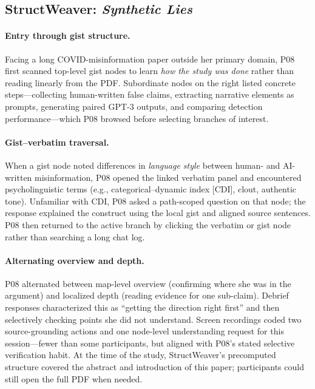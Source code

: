 \documentclass[manuscript,review,anonymous]{acmart}
\begin{document}
\subsection{StructWeaver: \textit{Synthetic Lies}}

\paragraph{Entry through gist structure.}
Facing a long COVID-misinformation paper outside her primary domain, P08 first scanned top-level gist nodes to learn \textit{how the study was done} rather than reading linearly from the PDF. Subordinate nodes on the right listed concrete steps---collecting human-written false claims, extracting narrative elements as prompts, generating paired GPT-3 outputs, and comparing detection performance---which P08 browsed before selecting branches of interest.

\paragraph{Gist--verbatim traversal.}
When a gist node noted differences in \textit{language style} between human- and AI-written misinformation, P08 opened the linked verbatim panel and encountered psycholinguistic terms (e.g., categorical--dynamic index [CDI], clout, authentic tone). Unfamiliar with CDI, P08 asked a path-scoped question on that node; the response explained the construct using the local gist and aligned source sentences. P08 then returned to the active branch by clicking the verbatim or gist node rather than searching a long chat log.

\paragraph{Alternating overview and depth.}
P08 alternated between map-level overview (confirming where she was in the argument) and localized depth (reading evidence for one sub-claim). Debrief responses characterized this as ``getting the direction right first'' and then selectively checking points she did not understand. Screen recordings coded two source-grounding actions and one node-level understanding request for this session---fewer than some participants, but aligned with P08's stated selective verification habit. At the time of the study, StructWeaver's precomputed structure covered the abstract and introduction of this paper; participants could still open the full PDF when needed.
\end{document}
